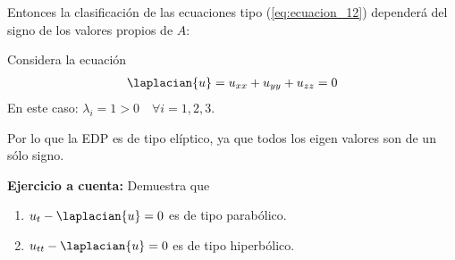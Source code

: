 Entonces la clasificación de las ecuaciones tipo (\ref{eq:ecuacion_12}) dependerá del signo de los valores propios de $A$:
\begin{center}
\end{center}
\begin{ejemplo}
Considera la ecuación
\begin{align*}
\laplacian{u} = u_{xx} + u_{yy} + u_{zz} = 0
\end{align*}
En este caso: $\lambda_{i} = 1 > 0 \quad \forall i = 1, 2, 3$. 
\par
Por lo que la EDP es de tipo elíptico, ya que todos los eigen valores son de un sólo signo.
\end{ejemplo}
\textbf{Ejercicio a cuenta:} Demuestra que
\begin{enumerate}[label=\roman*) ]
\item $u_{t} - \laplacian{u} = 0$ es de tipo parabólico.
\item $u_{tt} - \laplacian{u} = 0$ es de tipo hiperbólico.
\end{enumerate}
